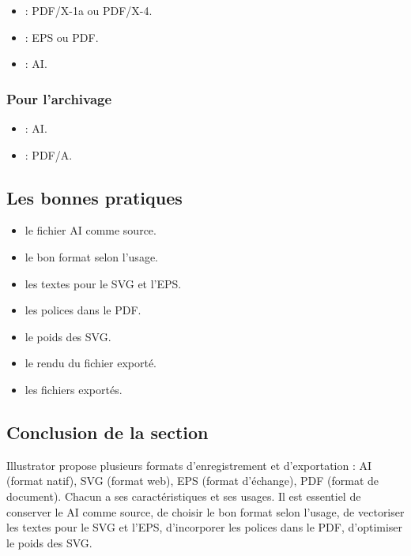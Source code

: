 \begin{itemize}
    \item {} : PDF/X-1a ou PDF/X-4.
    \item {} : EPS ou PDF.
    \item {} : AI.
\end{itemize}

\subsubsection{Pour l'archivage}

\begin{itemize}
    \item {} : AI.
    \item {} : PDF/A.
\end{itemize}

\subsection{Les bonnes pratiques}

\begin{itemize}
    \item {} le fichier AI comme source.
    \item {} le bon format selon l'usage.
    \item {} les textes pour le SVG et l'EPS.
    \item {} les polices dans le PDF.
    \item {} le poids des SVG.
    \item {} le rendu du fichier exporté.
    \item {} les fichiers exportés.
\end{itemize}

\subsection*{Conclusion de la section}

Illustrator propose plusieurs formats d'enregistrement et d'exportation : AI (format natif), SVG (format web), EPS (format d'échange), PDF (format de document). Chacun a ses caractéristiques et ses usages. Il est essentiel de conserver le AI comme source, de choisir le bon format selon l'usage, de vectoriser les textes pour le SVG et l'EPS, d'incorporer les polices dans le PDF, d'optimiser le poids des SVG.

